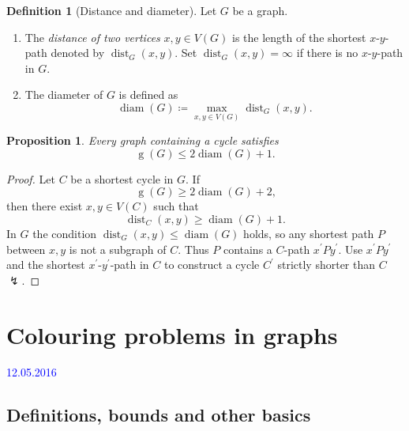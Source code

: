 \documentclass[a4paper]{article}
\newcommand{\lecture}{\vspace{5mm}\textcolor{blue}}
\theoremstyle{definition}\newtheorem*{defi*}{Definition}
\theoremstyle{remark}\newtheorem*{rem}{Remark}
\theoremstyle{plain}\newtheorem{lemma}[cnt]{Lemma}
\theoremstyle{definition}\newtheorem*{ex}{Example}
\theoremstyle{definition}\newtheorem*{exs}{Examples}
\theoremstyle{plain}\newtheorem{theorem}[cnt]{Theorem}
\theoremstyle{plain}\newtheorem{prop}[cnt]{Proposition}
\theoremstyle{plain}\newtheorem*{cor*}{Corollary}
\theoremstyle{definition}\newtheorem{nota}{Notation}
\theoremstyle{definition}\newtheorem*{nota*}{Notation}
\theoremstyle{plain}\newtheorem{conj}[cnt]{Conjecture}
\DeclareMathOperator{\girth}{g}
\DeclareMathOperator{\dist}{dist}
\DeclareMathOperator{\diam}{diam}
\begin{document}
\begin{defi*}[Distance and diameter]
  Let $G$ be a graph.
  \begin{enumerate}[label=(\alph*)]
    \item The \emph{distance of two vertices} $x,y \in V(G)$ is the length of the shortest $x$-$y$-path denoted by $\dist_G(x,y)$.
    Set $\dist_G(x,y) = \infty$ if there is no $x$-$y$-path in $G$.
    \item The diameter of $G$ is defined as
    \[ \diam(G) \coloneqq \max_{x,y \in V(G)} \dist_G(x,y) \text{.} \]
  \end{enumerate}
\end{defi*}

\begin{prop}
  Every graph containing a cycle satisfies 
  \[ \girth(G) \leq 2 \diam(G) + 1 \text{.} \]
\end{prop}

\begin{proof}
  Let $C$ be a shortest cycle in $G$.
  If 
  \[ \girth(G) \geq 2 \diam(G) + 2 \text{,} \]
  then there exist $x,y \in V(C)$ such that
  \[ \dist_C(x,y) \geq \diam(G) + 1 \text{.} \]
  In $G$ the condition $\dist_G(x,y) \leq \diam(G)$ holds, so any shortest path $P$ between $x,y$ is not a subgraph of $C$.
  Thus $P$ contains a $C$-path $x^\prime P y^\prime$.
  Use $x^\prime P y^\prime$ and the shortest $x^\prime$-$y^\prime$-path in $C$ to construct a cycle $C^\prime$ strictly shorter than $C$ $\lightning$.
\end{proof}

















\section{Colouring problems in graphs}

\lecture{12.05.2016}

\subsection{Definitions, bounds and other basics}
\end{document}
